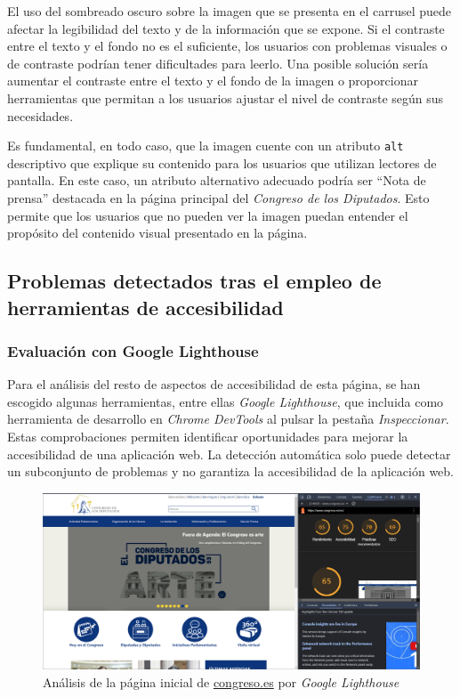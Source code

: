 \documentclass[]{article}
\begin{document}
El uso del sombreado oscuro sobre la imagen que se presenta en el carrusel puede afectar la legibilidad del texto y de la información que se expone. Si el contraste entre el texto y el fondo no es el suficiente, los usuarios con problemas visuales o de contraste podrían tener dificultades para leerlo. Una posible solución sería aumentar el contraste entre el texto y el fondo de la imagen o proporcionar herramientas que permitan a los usuarios ajustar el nivel de contraste según sus necesidades.

Es fundamental, en todo caso, que la imagen cuente con un atributo \texttt{alt} descriptivo que explique su contenido para los usuarios que utilizan lectores de pantalla. En este caso, un atributo alternativo adecuado podría ser ``Nota de prensa'' destacada en la página principal del \textit{Congreso de los Diputados}. Esto permite que los usuarios que no pueden ver la imagen puedan entender el propósito del contenido visual presentado en la página.

\subsection{Problemas detectados tras el empleo de herramientas de accesibilidad}

\subsubsection{Evaluación con Google Lighthouse}

Para el análisis del resto de aspectos de accesibilidad de esta página, se han escogido algunas herramientas, entre ellas \textit{Google Lighthouse}, que incluida como herramienta de desarrollo en \textit{Chrome DevTools} al pulsar la pestaña \textit{Inspeccionar}. Estas comprobaciones permiten identificar oportunidades para mejorar la accesibilidad de una aplicación web. La detección automática solo puede detectar un subconjunto de problemas y no garantiza la accesibilidad de la aplicación web.

\begin{figure}[h]
	\centering
	\includegraphics[width=\textwidth]{Capturas/1.png}
	\caption{Análisis de la página inicial de \href{https://www.congreso.es/es/home}{congreso.es} por \textit{Google Lighthouse}}
	\label{fig:etiqueta}
\end{figure}
\end{document}
